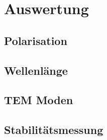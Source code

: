 \section{Auswertung}
\subsection{Polarisation}
\subsection{Wellenlänge}
\subsection{TEM Moden}
%
%
%
%
%
\subsection{Stabilitätsmessung}
